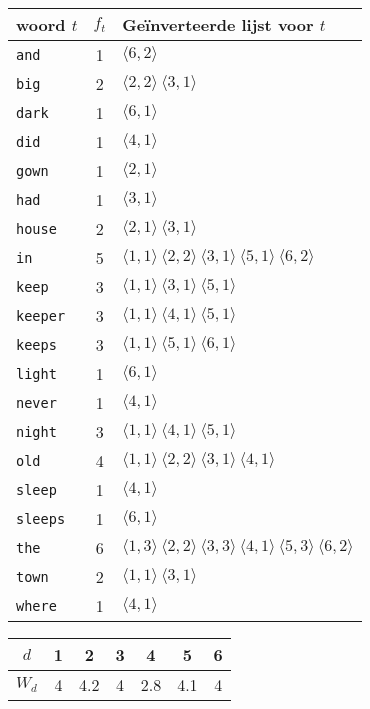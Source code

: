 \begin{itemize}
    \begin{table}[ht]
        \centering
        \begin{tabular}{l c | l}
            woord $t$ & $f_t$ & Geïnverteerde lijst voor $t$ \\
            \hline
            \texttt{and}    & 1 & $\langle 6, 2\rangle$ \\
            \texttt{big}    & 2 & $\langle 2, 2\rangle\ \langle 3, 1\rangle$\\
            \texttt{dark}   & 1 & $\langle 6, 1\rangle$\\
            \texttt{did}    & 1 & $\langle 4, 1\rangle$\\
            \texttt{gown}   & 1 & $\langle 2, 1\rangle$\\
            \texttt{had}    & 1 & $\langle 3, 1\rangle$\\
            \texttt{house}  & 2 & $\langle 2, 1\rangle\ \langle 3, 1\rangle$\\
            \texttt{in}     & 5 & $\langle 1, 1\rangle\ \langle 2, 2\rangle\ \langle 3, 1\rangle\ \langle 5, 1\rangle\ \langle 6, 2\rangle$\\
            \texttt{keep}   & 3 & $\langle 1, 1\rangle\ \langle 3, 1\rangle\ \langle 5, 1\rangle$\\
            \texttt{keeper} & 3 & $\langle 1, 1\rangle\ \langle 4, 1\rangle\ \langle 5, 1\rangle$\\
            \texttt{keeps}  & 3 & $\langle 1, 1\rangle\ \langle 5, 1\rangle\ \langle 6, 1\rangle$\\
            \texttt{light}  & 1 & $\langle 6, 1\rangle$\\
            \texttt{never}  & 1 & $\langle 4, 1\rangle$\\
            \texttt{night}  & 3 & $\langle 1, 1\rangle\ \langle 4, 1\rangle\ \langle 5, 1\rangle$\\
            \texttt{old}    & 4 & $\langle 1, 1\rangle\ \langle 2, 2\rangle\ \langle 3, 1\rangle\ \langle 4, 1\rangle$\\
            \texttt{sleep}  & 1 & $\langle 4, 1\rangle$\\
            \texttt{sleeps} & 1 & $\langle 6, 1\rangle$\\
            \texttt{the}    & 6 & $\langle 1, 3\rangle\ \langle 2, 2\rangle\ \langle 3, 3\rangle\ \langle 4, 1\rangle\ \langle 5, 3\rangle\ \langle 6, 2\rangle$\\
            \texttt{town}   & 2 & $\langle 1, 1\rangle\ \langle 3, 1\rangle$\\
            \texttt{where}  & 1 & $\langle 4, 1\rangle$\\
        \end{tabular}
        \begin{tabular}{c |c c c c c c}
            $d$ & 1 & 2 & 3 & 4 & 5 & 6\\
            \hline
            $W_d$ & 4 & 4.2 & 4 & 2.8 & 4.1 & 4


\end{tabular}
\end{table}
\end{itemize}
